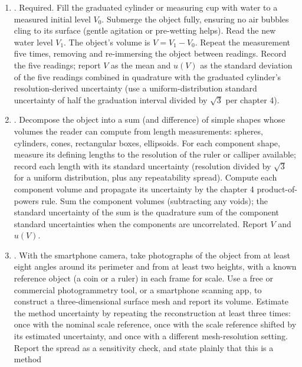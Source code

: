 \begin{project}
\begin{enumerate}[leftmargin=*]
  \item {}. Required.
    Fill the graduated cylinder or measuring cup with water to a
    measured initial level $V_{0}$. Submerge the object fully,
    ensuring no air bubbles cling to its surface (gentle agitation
    or pre-wetting helps). Read the new water level $V_{1}$. The
    object's volume is $V = V_{1} - V_{0}$. Repeat the measurement
    five times, removing and re-immersing the object between
    readings. Record the five readings; report $V$ as the mean and
    $u(V)$ as the standard deviation of the five readings combined
    in quadrature with the graduated cylinder's resolution-derived
    uncertainty (use a uniform-distribution standard uncertainty
    of half the graduation interval divided by $\sqrt{3}$ per
    chapter 4).
  \item {}. Decompose the object into
    a sum (and difference) of simple shapes whose volumes the
    reader can compute from length measurements: spheres, cylinders,
    cones, rectangular boxes, ellipsoids. For each component shape,
    measure its defining lengths to the resolution of the ruler or
    calliper available; record each length with its standard
    uncertainty (resolution divided by $\sqrt{3}$ for a uniform
    distribution, plus any repeatability spread). Compute each
    component volume and propagate its uncertainty by the chapter 4
    product-of-powers rule. Sum the component volumes (subtracting
    any voids); the standard uncertainty of the sum is the
    quadrature sum of the component standard uncertainties when the
    components are uncorrelated. Report $V$ and $u(V)$.
  \item {}. With the smartphone
    camera, take photographs of the object from at least eight
    angles around its perimeter and from at least two heights, with
    a known reference object (a coin or a ruler) in each frame for
    scale. Use a free or commercial photogrammetry tool, or a
    smartphone scanning app, to construct a three-dimensional
    surface mesh and report its volume. Estimate the method
    uncertainty by repeating the reconstruction at least three
    times: once with the nominal scale reference, once with the
    scale reference shifted by its estimated uncertainty, and once
    with a different mesh-resolution setting. Report the spread as
    a sensitivity check, and state plainly that this is a method

\end{enumerate}
\end{project}
